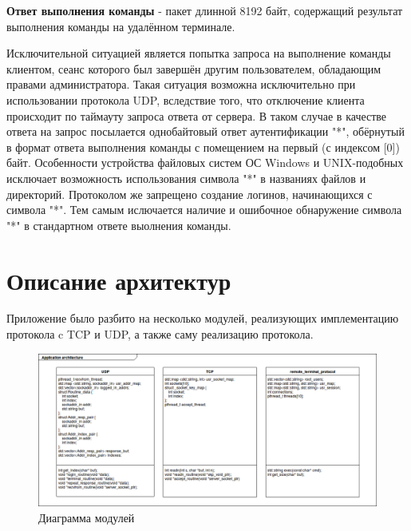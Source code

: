 \textbf{Ответ выполнения команды} - пакет длинной 8192 байт, содержащий результат выполнения команды на удалённом терминале.

Исключительной ситуацией является попытка запроса на выполнение команды клиентом, сеанс которого был завершён другим пользователем, обладающим правами администратора. Такая ситуация возможна исключительно при использовании протокола UDP, вследствие того, что отключение клиента происходит по таймауту запроса ответа от сервера. В таком случае в качестве ответа на запрос посылается однобайтовый ответ аутентификации "*", обёрнутый в формат ответа выполнения команды с помещением на первый (с индексом [0]) байт. Особенности устройства файловых систем ОС Windows и UNIX-подобных исключает возможность использования символа "*" в названиях файлов и директорий. Протоколом же запрещено создание логинов, начинающихся с символа "*". Тем самым ислючается наличие и ошибочное обнаружение символа "*" в стандартном ответе выолнения команды.

\section{Описание архитектур}

Приложение было разбито на несколько модулей, реализующих имплементацию протокола c TCP и UDP, а также саму реализацию протокола.

\begin{figure}[H]
\centering
\includegraphics[width=1\textwidth]{pics/arch.png}
\caption{Диаграмма модулей}
\label{diag_mod}
\end{figure}

